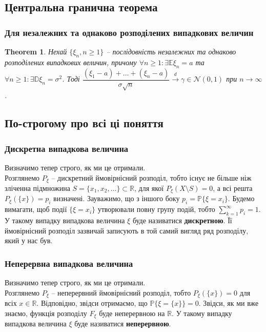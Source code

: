 \documentclass[a4paper, 10pt]{article}
\theoremstyle{theoremdd}
\newtheorem{theorem}{Theorem}[subsection]
\newcommand{\todistribution}{\overset{d}{\to}}
\begin{document}
\subsection{Центральна гранична теорема}
\subsubsection{Для незалежних та однаково розподілених випадкових величин}
\begin{theorem}
Нехай $\{\xi_n, n \geq 1 \}$ -- послідовність незалежних та однаково розподілених випадкових величин, причому $\forall n \geq 1: \exists \mathbb{E}\xi_n = a$ та $\forall n \geq 1: \exists \mathbb{D}\xi_n = \sigma^2$. Тоді $\dfrac{(\xi_1 - a) + \dots + (\xi_n - a)}{ \sigma \sqrt{n}} \todistribution \gamma \in \mathcal{N}(0,1)$ при $n \to \infty$.
\end{theorem}

\newpage
\subsection*{По-строгому про всі ці поняття}
\subsubsection*{Дискретна випадкова величина}
Визначимо тепер строго, як ми це отримали.\\
Розглянемо $P_\xi$ -- дискретний ймовірнісний розподіл, тобто існує не більше ніж зліченна підмножина $S = \{x_1,x_2,\dots\} \subset \mathbb{R}$, для якої $P_{\xi}(X \setminus S) = 0$, а всі решта $P_\xi(\{x\}) = p_i$ визначені. Зауважимо, що з іншого боку $p_i = \mathbb{P}\{\xi = x_i\}$. Будемо вимагати, щоб події $\{\xi = x_i\}$ утворювали повну групу подій, тобто $\displaystyle\sum_{k=1}^\infty p_i = 1$. У такому випадку випадкова величина $\xi$ буде називатися \textbf{дискретною}. Її ймовірнісний розподіл зазвичай записують в той самий вигляд ряд розподілу, який у нас був.

\subsubsection*{Неперервна випадкова величина}
Визначимо тепер строго, як ми це отримали.\\
Розглянемо $P_{\xi}$ -- неперервний ймовірнісний розподіл, тобто $P_\xi(\{x\}) = 0$ для всіх $x \in \mathbb{R}$. Відповідно, звідси отримаємо, що $\mathbb{P}\{\xi = \{x\}\} = 0$. Звідси, як ми вже знаємо, функція розподілу $F_\xi$ буде неперервною на $\mathbb{R}$. У такому випадку випадкова величина $\xi$ буде називатися \textbf{неперервною}.
\end{document}
